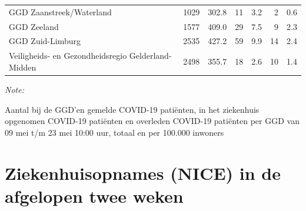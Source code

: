 \documentclass[
  english,
  man,floatsintext]{apa6}
\begin{document}
\begin{table}
\begin{threeparttable}
\begin{tabular}{lrrrrrr}
GGD Zaanstreek/Waterland & 1029 & 302.8 & 11 & 3.2 & 2 & 0.6\\
GGD Zeeland & 1577 & 409.0 & 29 & 7.5 & 9 & 2.3\\
GGD Zuid-Limburg & 2535 & 427.2 & 59 & 9.9 & 14 & 2.4\\
Veiligheids- en Gezondheidsregio Gelderland-Midden & 2498 & 355.7 & 18 & 2.6 & 10 & 1.4\\
\bottomrule
\end{tabular}
\begin{tablenotes}
\item \textit{Note: } 
\item Aantal bij de GGD’en gemelde COVID-19 patiënten, in het ziekenhuis opgenomen COVID-19 patiënten en overleden COVID-19 patiënten per GGD van 09 mei t/m 23 mei 10:00 uur, totaal en per 100.000 inwoners
\end{tablenotes}
\end{threeparttable}
\endgroup{}
\end{table}

\newpage

\hypertarget{ziekenhuisopnames-nice-in-de-afgelopen-twee-weken}{%
\section{Ziekenhuisopnames (NICE) in de afgelopen twee weken}\label{ziekenhuisopnames-nice-in-de-afgelopen-twee-weken}}
\end{document}
